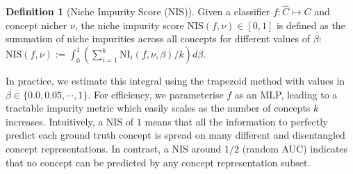 \documentclass[withindex,glossary]{cam-thesis}
\theoremstyle{plain}
\theoremstyle{definition}
\newtheorem{definition}[theorem]{Definition}
\theoremstyle{remark}
\begin{document}
\begin{definition}[Niche Impurity Score (NIS)] \label{def:niche_impurity_score}
Given a classifier $f: \hat{C} \mapsto C$ and concept nicher $\nu$, the niche impurity score $\text{NIS}(f,\nu) \in [0,1]$ is defined as the summation of niche impurities across all concepts for different values of $\beta$: $\text{NIS}(f,\nu) := \int_{0}^{1} (\sum_{i=1}^{k} \text{NI}_i(f, \nu, \beta)/k) d\beta$.
\end{definition}

In practice, we estimate this integral using the trapezoid method with values in $\beta \in \{ 0.0, 0.05, \cdots, 1\}$. For efficiency, we parameterise $f$ as an MLP,
leading to a tractable impurity metric which easily scales as the number of concepts $k$ increases. Intuitively, a NIS of $1$ means that all the information to perfectly predict each ground truth concept is spread on many different and disentangled concept representations. In contrast, a NIS around $1/2$ (random AUC) indicates that no concept can be predicted by any concept representation subset.
\end{document}
